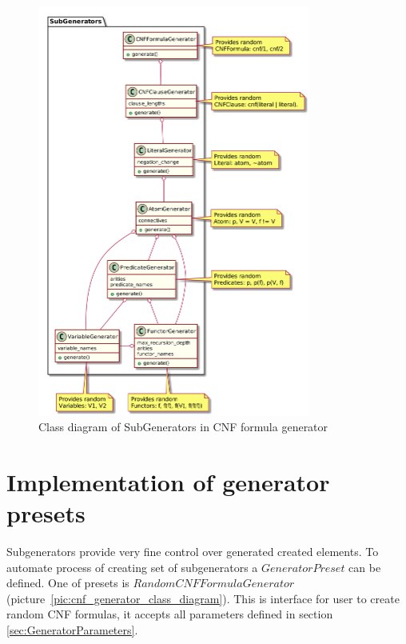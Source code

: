 \begin{figure}[h]
\begin{centering}
  \includegraphics[width=0.8\textwidth]{logic-formula-generator/fol/cnf_signature_generators.png}
  \caption{Class diagram of SubGenerators in CNF formula generator}
  \label{pic:fol_signature_generator_class_diagram}
\end{centering}
\end{figure}

\section{Implementation of generator presets}
\label{sec:GeneratorPresets}

Subgenerators provide very fine control over generated created elements. To automate process of creating set of subgenerators a $GeneratorPreset$ can be defined. One of presets is $RandomCNFFormulaGenerator$ (picture~\ref{pic:cnf_generator_class_diagram}). This is interface for user to create random CNF formulas, it accepts all parameters defined in section \ref{sec:GeneratorParameters}.

